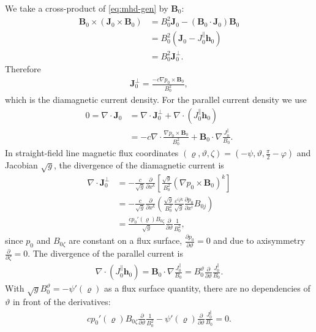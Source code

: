 \documentclass[a4paper, twoside, 10pt, english]{article}
\numberwithin{equation}{section}
\let\temp\varrho
\let\varrho\rho
\let\rho\temp
\let\temp\vartheta
\let\vartheta\theta
\let\theta\temp
\let\temp\varphi
\let\varphi\phi
\let\phi\temp
\let\vec\symbf
\newcommand*\grad{\ensuremath{\nabla}}
\newcommand*\divg{\ensuremath{\nabla \cdot}}
\newcommand*\pd[2][]{\ensuremath{\frac{\partial #1}{\partial #2}}}  %
\begin{document}
We take a cross-product of \cref{eq:mhd-gen} by $\vec{B}_{0}$:
\begin{align}
  \vec{B}_{0} \times \left( \vec{J}_{0} \times \vec{B}_{0} \right) &= B_{0}^{2} \vec{J}_{0} - (\vec{B}_{0} \cdot \vec{J}_{0}) \vec{B}_{0} \nonumber \\
  &= B_{0}^{2} (\vec{J}_{0} - J_{0}^{\parallel} \vec{h}_{0}) \nonumber \\
  &= B_{0}^{2} \vec{J}_{0}^{\perp}.
\end{align}
Therefore
\begin{gather}
  \vec{J}_{0}^{\perp} = \frac{-c \grad p_{0} \times \vec{B}_{0}}{B_{0}^{2}},
\end{gather}
which is the diamagnetic current density. For the parallel current density we use
\begin{align}
 0 = \divg \vec{J}_{0} &= \divg \vec{J}_{0}^{\perp} + \divg (J_{0}^{\parallel} \vec{h}_{0}) \nonumber \\
 &= -c \divg \frac{\grad p_{0} \times \vec{B}_{0}}{B_{0}^{2}} + \vec{B}_{0} \cdot \grad \frac{J_{0}^{\parallel}}{B_{0}}.
\end{align}
In straight-field line magnetic flux coordinates $(\rho, \theta, \zeta) = (-\psi, \theta, \frac{\pi}{2} - \phi)$ and Jacobian $\sqrt{g}$, the divergence of the diamagnetic current is
\begin{align}
  \divg \vec{J}_{0}^{\perp} &= -\frac{c}{\sqrt{g}} \pd{x^{k}} \left[ \frac{\sqrt{g}}{B_{0}^{2}} \left( \grad p_{0} \times \vec{B}_{0} \right)^{k} \right] \nonumber \\
  &= -\frac{c}{\sqrt{g}} \pd{x^{k}} \left( \frac{\sqrt{g}}{B_{0}^{2}} \frac{\varepsilon^{ijk}}{\sqrt{g}} \pd[p_{0}]{x^{i}} B_{0 j} \right) \nonumber \\
  &= \frac{c p_{0}' (\rho) B_{0 \zeta}}{\sqrt{g}} \pd{\theta} \frac{1}{B_{0}^{2}},
\end{align}
since $p_{0}$ and $B_{0 \zeta}$ are constant on a flux surface, $\pd[p_{0}]{\theta} = 0$ and due to axisymmetry $\pd{\zeta} = 0$. The divergence of the parallel current is
\begin{gather}
  \divg(J_{0}^{\parallel} \vec{h}_{0}) = \vec{B}_{0} \cdot \grad \frac{J_{0}^{\parallel}}{B_{0}} = B_{0}^{\theta} \pd{\theta} \frac{J_{0}^{\parallel}}{B_{0}}.
\end{gather}
With $\sqrt{g} B_{0}^{\theta} = -\psi'(\rho)$ as a flux surface quantity, there are no dependencies of $\theta$ in front of the derivatives:
\begin{gather}
  c p_{0}' (\rho) B_{0 \zeta} \pd{\theta} \frac{1}{B_{0}^{2}} - \psi'(\rho) \pd{\theta} \frac{J_{0}^{\parallel}}{B_{0}} = 0.
\end{gather}
\end{document}
